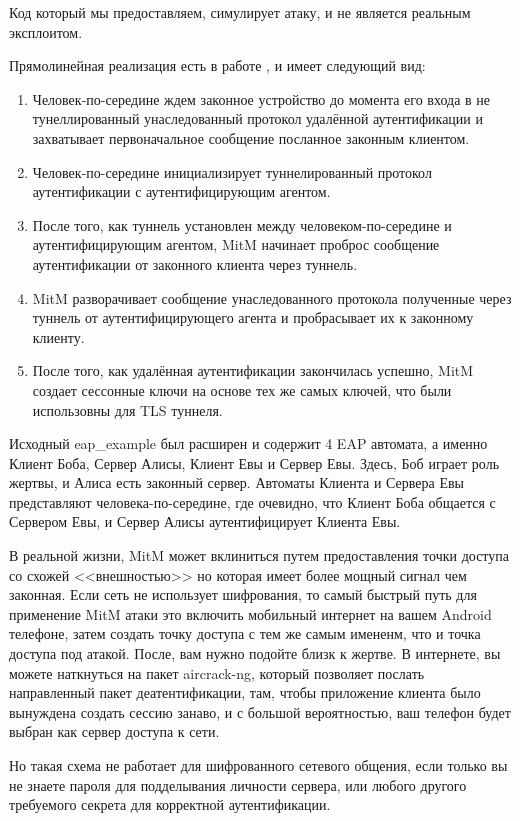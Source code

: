 \documentclass[oneside, final, 14pt]{extarticle}
\begin{document}
Код \cite{GMI}  который мы предоставляем, симулирует атаку,
и не является реальным эксплоитом.

Прямолинейная реализация есть в работе \cite{tap2002},
и имеет следующий вид:
\begin{enumerate}
  \item Человек-по-середине ждем законное устройство до момента его входа
    в не тунеллированный унаследованный протокол удалённой аутентификации
    и захватывает первоначальное сообщение посланное законным клиентом.
  \item Человек-по-середине инициализирует туннелированный протокол аутентификации
    с аутентифицирующим агентом.
  \item После того, как туннель установлен между человеком-по-середине и аутентифицирующим
    агентом, MitM начинает проброс сообщение аутентификации от законного клиента
    через туннель.
  \item MitM разворачивает сообщение унаследованного протокола полученные через туннель
    от аутентифицирующего агента
    и пробрасывает их к законному клиенту.
  \item После того, как удалённая аутентификации закончилась успешно,
    MitM создает сессонные ключи на основе тех же самых ключей,
    что были использовны для TLS туннеля.
\end{enumerate}

Исходный eap\_example был расширен и содержит 4 EAP автомата,
а именно Клиент Боба, Сервер Алисы, Клиент Евы и Сервер Евы.
Здесь, Боб играет роль жертвы,
и Алиса есть законный сервер.
Автоматы Клиента и Сервера Евы представляют
человека-по-середине,
где очевидно,
что Клиент Боба общается с Сервером Евы,
и Сервер Алисы аутентифицирует Клиента Евы.

В реальной жизни, MitM может вклиниться путем предоставления
точки доступа со схожей <<внешностью>> но которая имеет
более мощный сигнал чем законная.
Если сеть не использует шифрования,
то самый быстрый путь для применение MitM атаки это включить мобильный
интернет на вашем Android телефоне,
затем создать точку доступа с тем же самым имененм, что и точка доступа
под атакой.
После, вам нужно подойте близк к жертве.
В интернете, вы можете наткнуться на пакет aircrack-ng,
который позволяет послать направленный пакет деатентификации,
там, чтобы приложение клиента было вынуждена создать сессию
занаво,
и с большой вероятностью, ваш телефон будет выбран как сервер доступа к сети.

Но такая схема не работает для шифрованного сетевого общения,
если только вы не знаете пароля для подделывания личности сервера,
или любого другого требуемого секрета для корректной аутентификации.
\end{document}
